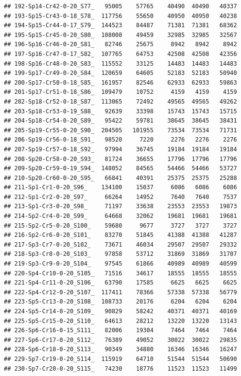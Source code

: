 \documentclass[]{article}
\begin{document}
\begin{verbatim}
## 192-Sp14-Cr42-0-20_S77_   95005    57765    40490  40490   40337
## 193-Sp15-Cr43-0-18_S78_  117756    55650    40950  40950   40238
## 194-Sp15-Cr44-0-17_S79_  144523    84487    71381  71381   68362
## 195-Sp15-Cr45-0-20_S80_  108008    49459    32985  32985   32567
## 196-Sp16-Cr46-0-20_S81_   82746    25675     8942   8942    8942
## 197-Sp16-Cr47-0-17_S82_  107765    64753    42508  42508   42356
## 198-Sp16-Cr48-0-20_S83_  115552    33125    14483  14483   14483
## 199-Sp17-Cr49-0-20_S84_  120659    64605    52183  52183   50940
## 200-Sp17-Cr50-0-18_S85_  161957    82546    62933  62933   59863
## 201-Sp17-Cr51-0-18_S86_  109479    10752     4159   4159    4159
## 202-Sp18-Cr52-0-18_S87_  113065    72492    49565  49565   49262
## 203-Sp18-Cr53-0-19_S88_   92639    33398    15743  15743   15715
## 204-Sp18-Cr54-0-20_S89_   95422    59781    38645  38645   38431
## 205-Sp19-Cr55-0-20_S90_  204505   101955    73534  73534   71731
## 206-Sp19-Cr56-0-18_S91_   98520     7220     2276   2276    2276
## 207-Sp19-Cr57-0-18_S92_   97994    36745    19184  19184   19184
## 208-Sp20-Cr58-0-20_S93_   81724    36655    17796  17796   17796
## 209-Sp20-Cr59-0-19_S94_  148052    84565    54466  54466   53727
## 210-Sp20-Cr60-0-20_S95_   66841    40391    25375  25375   25288
## 211-Sp1-Cr1-0-20_S96_    134100    15037     6086   6086    6086
## 212-Sp1-Cr2-0-20_S97_     66264    14952     7640   7640    7537
## 213-Sp1-Cr3-0-20_S98_     71197    33638    23553  23553   19873
## 214-Sp2-Cr4-0-20_S99_     64668    32062    19681  19681   19681
## 215-Sp2-Cr5-0-20_S100_    59680     9677     3727   3727    3727
## 216-Sp2-Cr6-0-20_S101_    83270    51845    41388  41388   41287
## 217-Sp3-Cr7-0-20_S102_    73671    46034    29507  29507   29332
## 218-Sp3-Cr8-0-20_S103_    97858    53712    31869  31869   31707
## 219-Sp3-Cr9-0-20_S104_    97545    61866    40989  40989   40599
## 220-Sp4-Cr10-0-20_S105_   71516    34617    18555  18555   18555
## 221-Sp4-Cr11-0-20_S106_   63790    17585     6625   6625    6625
## 222-Sp4-Cr12-0-20_S107_  117411    78366    57338  57338   56779
## 223-Sp5-Cr13-0-20_S108_  108733    20176     6204   6204    6204
## 224-Sp5-Cr14-0-20_S109_   90829    58242    40371  40371   40169
## 225-Sp5-Cr15-0-20_S110_   64613    28212    13220  13220   13143
## 226-Sp6-Cr16-0-15_S111_   82006    19304     7464   7464    7464
## 227-Sp6-Cr17-0-20_S112_   76389    49052    30022  30022   29835
## 228-Sp6-Cr18-0-20_S113_   90349    34880    16346  16346   16247
## 229-Sp7-Cr19-0-20_S114_  115919    64710    51544  51544   50690
## 230-Sp7-Cr20-0-20_S115_   74230    18776    11523  11523   11499

\end{verbatim}
\end{document}
